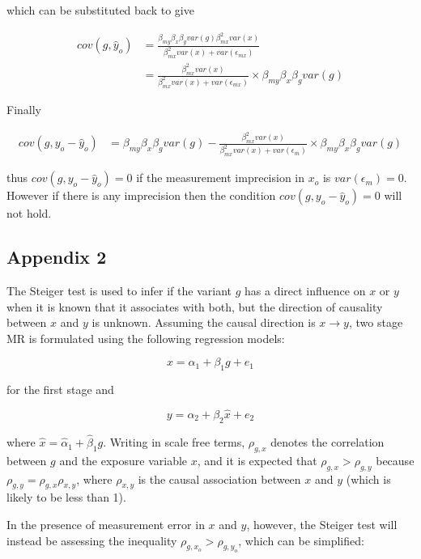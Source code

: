 \documentclass[]{article}
\begin{document}
which can be substituted back to give

\[
\begin{aligned}
cov(g, \hat{y}_o) & = \frac{\beta_{my} \beta_x \beta_g var(g) \beta_{mx}^2 var(x)} {\beta_{mx}^2 var(x) + var(\epsilon_{mx})} \\
                  & = \frac{\beta_{mx}^2 var(x)} {\beta_{mx}^2 var(x) + var(\epsilon_{mx})} \times \beta_{my} \beta_x \beta_g var(g)
\end{aligned}
\]

Finally

\[
\begin{aligned}
cov(g, y_o - \hat{y}_o) & = \beta_{my} \beta_x \beta_g var(g) - \frac{\beta_{mx}^2 var(x)} {\beta_{mx}^2 var(x) + var(\epsilon_m)} \times \beta_{my} \beta_x \beta_g var(g)
\end{aligned}
\]

thus \(cov(g, y_o - \hat{y}_o) = 0\) if the measurement imprecision in
\(x_o\) is \(var(\epsilon_m) = 0\). However if there is any imprecision
then the condition \(cov(g, y_o - \hat{y}_o) = 0\) will not hold.

\subsection{Appendix 2}\label{appendix-2}

The Steiger test is used to infer if the variant \(g\) has a direct
influence on \(x\) or \(y\) when it is known that it associates with
both, but the direction of causality between \(x\) and \(y\) is unknown.
Assuming the causal direction is \(x \to y\), two stage MR is formulated
using the following regression models:

\[
x = \alpha_1 + \beta_1 g + e_1
\]

for the first stage and

\[
y = \alpha_2 + \beta_2 \hat{x} + e_2
\]

where \(\hat{x} = \hat{\alpha}_1 + \hat{\beta}_1 g\). Writing in scale
free terms, \(\rho_{g, x}\) denotes the correlation between \(g\) and
the exposure variable \(x\), and it is expected that
\(\rho_{g, x} > \rho_{g, y}\) because
\(\rho_{g, y} = \rho_{g, x}\rho_{x, y}\), where \(\rho_{x, y}\) is the
causal association between \(x\) and \(y\) (which is likely to be less
than 1).

In the presence of measurement error in \(x\) and \(y\), however, the
Steiger test will instead be assessing the inequality
\(\rho_{g, x_o} > \rho_{g, y_o}\), which can be simplified:
\end{document}
